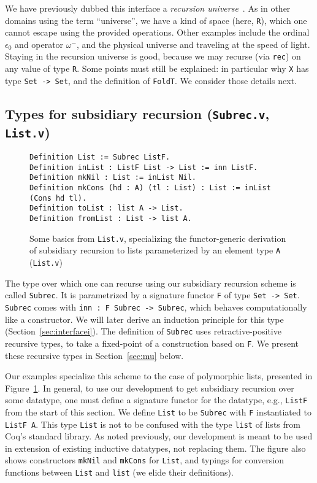 \documentclass[a4paper,USenglish]{lipics-v2021}
\begin{document}
We have previously dubbed this interface a \emph{recursion
  universe}~\cite{stump20}.  As in other domains using the term
``universe'', we have a kind of space (here, \verb|R|), which one
cannot escape using the provided operations.  Other examples include the
ordinal $\epsilon_0$ and operator $\omega^-$, and the physical
universe and traveling at the speed of light.  Staying in the
recursion universe is good, because we may recurse (via \verb|rec|) on
any value of type \verb|R|.  Some points must still be explained: in
particular why \verb|X| has type \verb|Set -> Set|, and the definition
of \verb|FoldT|. We consider those details next.

\subsection{Types for subsidiary recursion (\texttt{Subrec.v}, \texttt{List.v})}


\begin{figure}
\begin{verbatim}
Definition List := Subrec ListF.
Definition inList : ListF List -> List := inn ListF.
Definition mkNil : List := inList Nil.
Definition mkCons (hd : A) (tl : List) : List := inList (Cons hd tl).
Definition toList : list A -> List.
Definition fromList : List -> list A.
\end{verbatim}
  \caption{Some basics from \texttt{List.v}, specializing the
    functor-generic derivation of subsidiary recursion to
    lists parameterized by an element type \texttt{A}  (\texttt{List.v})}
  \label{fig:listf}
\end{figure}

The type over which one can recurse using our subsidiary
recursion scheme is called \verb|Subrec|.  It is parametrized by a signature
functor \verb|F| of type \verb|Set -> Set|.  \verb|Subrec| comes with
\verb|inn : F Subrec -> Subrec|, which behaves computationally like a
constructor.  We will later derive an induction principle for this type
(Section~\ref{sec:interfacei}). The definition of \verb|Subrec| uses
retractive-positive recursive types, to take a fixed-point of a
construction based on \verb|F|.  We present these recursive types in
Section~\ref{sec:mu} below.

Our examples specialize this scheme to the case of polymorphic lists,
presented in Figure~\ref{fig:listf}.  In general, to use our
development to get subsidiary recursion over some datatype, one must
define a signature functor for the datatype, e.g., \verb|ListF| from
the start of this section. We define \verb|List| to be
\verb|Subrec| with \verb|F| instantiated to \verb|ListF A|.  This
type \verb|List| is not to be confused with the type \verb|list| of
lists from Coq's standard library.  As noted previously, our development
is meant to be used in extension of existing inductive datatypes, not
replacing them.  The figure also shows constructors \verb|mkNil| and
\verb|mkCons| for \verb|List|, and typings for conversion functions
between \verb|List| and \verb|list| (we elide their definitions).
\end{document}
